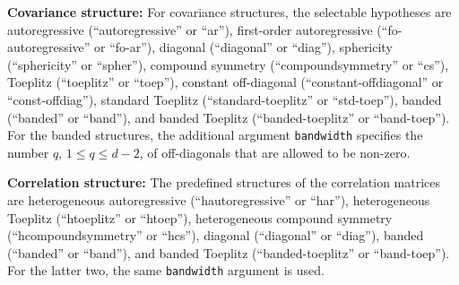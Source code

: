 \begin{itemize}
  \textbf{Covariance structure:} For covariance structures, the
  selectable hypotheses are autoregressive (``autoregressive'' or
  ``ar''), first-order autoregressive (``fo-autoregressive'' or
  ``fo-ar''), diagonal (``diagonal'' or ``diag''), sphericity
  (``sphericity'' or ``spher''), compound symmetry (``compoundsymmetry''
  or ``cs''), Toeplitz (``toeplitz'' or ``toep''), constant off-diagonal
  (``constant-offdiagonal'' or ``const-offdiag''), standard Toeplitz
  (``standard-toeplitz'' or ``std-toep''), banded (``banded'' or
  ``band''), and banded Toeplitz (``banded-toeplitz'' or
  ``band-toep''). For the banded structures, the additional argument
  \texttt{bandwidth} specifies the number \(q\), \(1 \leq q \leq d-2\), of
  off-diagonals that are allowed to be non-zero.

  \textbf{Correlation structure:} The predefined structures of
  the correlation matrices are heterogeneous autoregressive
  (``hautoregressive'' or ``har''), heterogeneous Toeplitz
  (``htoeplitz'' or ``htoep''), heterogeneous compound symmetry
  (``hcompoundsymmetry'' or ``hcs''), diagonal (``diagonal'' or
  ``diag''), banded (``banded'' or ``band''), and banded Toeplitz
  (``banded-toeplitz'' or ``band-toep''). For the latter two, the same
  \texttt{bandwidth} argument is used.


\end{itemize}
